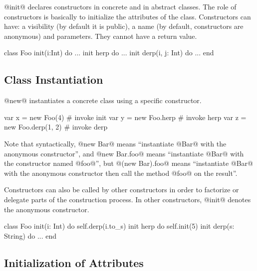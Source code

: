 @init@ declares constructors in concrete and in abstract classes.
The role of constructors is basically to initialize the attributes of the class.
Constructors can have: a visibility (by default it is public), a name (by default, constructors are anonymous) and parameters.
They cannot have a return value.

\begin{lst}
class Foo
	init(i:Int) do ...
	init herp do ...
	init derp(i, j: Int) do ...
end
\end{lst}

\subsection{Class Instantiation}\label{new}

@new@ instantiates a concrete class using a specific constructor. 
\begin{lst}
var x = new Foo(4) # invoke init
var y = new Foo.herp # invoke herp
var z = new Foo.derp(1, 2) # invoke derp
\end{lst}
Note that syntactically, @new Bar@ means ``instantiate @Bar@ with the anonymous constructor'', and @new Bar.foo@ means ``instantiate @Bar@ with the constructor named @foo@'', but @(new Bar).foo@ means ``instantiate @Bar@ with the anonymous constructor then call the method @foo@ on the result''.

Constructors can also be called by other constructors in order to factorize or delegate parts of the construction process.
In other constructors, @init@ denotes the anonymous constructor.
\begin{lst}
class Foo
	init(i: Int) do self.derp(i.to_s)
	init herp do self.init(5)
	init derp(s: String) do ...
end
\end{lst}

\subsection{Initialization of Attributes}\label{initialization}\label{isset}

